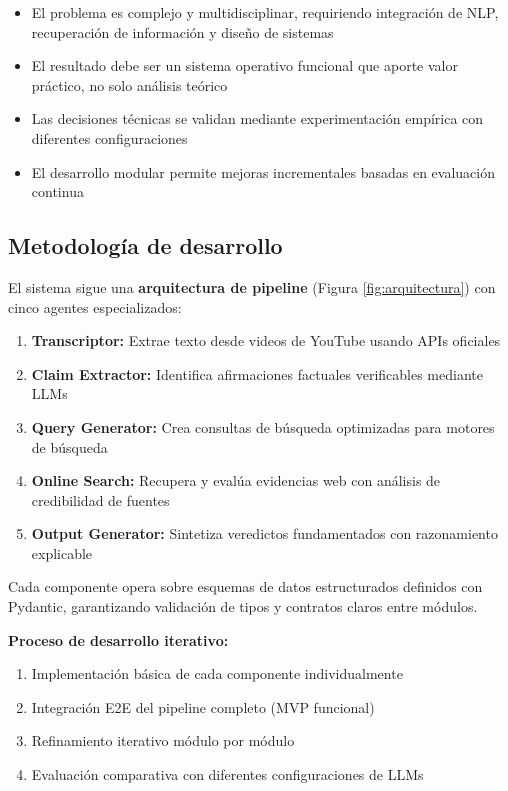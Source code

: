 \documentclass[12pt,a4paper]{article}
\begin{document}
\begin{itemize}
    \item El problema es complejo y multidisciplinar, requiriendo integración de NLP, recuperación de información y diseño de sistemas
    \item El resultado debe ser un sistema operativo funcional que aporte valor práctico, no solo análisis teórico
    \item Las decisiones técnicas se validan mediante experimentación empírica con diferentes configuraciones
    \item El desarrollo modular permite mejoras incrementales basadas en evaluación continua
\end{itemize}

\subsection{Metodología de desarrollo}

El sistema sigue una \textbf{arquitectura de pipeline} (Figura \ref{fig:arquitectura}) con cinco agentes especializados:

\begin{enumerate}
    \item \textbf{Transcriptor:} Extrae texto desde videos de YouTube usando APIs oficiales
    \item \textbf{Claim Extractor:} Identifica afirmaciones factuales verificables mediante LLMs
    \item \textbf{Query Generator:} Crea consultas de búsqueda optimizadas para motores de búsqueda
    \item \textbf{Online Search:} Recupera y evalúa evidencias web con análisis de credibilidad de fuentes
    \item \textbf{Output Generator:} Sintetiza veredictos fundamentados con razonamiento explicable
\end{enumerate}

Cada componente opera sobre esquemas de datos estructurados definidos con Pydantic, garantizando validación de tipos y contratos claros entre módulos.

\textbf{Proceso de desarrollo iterativo:}
\begin{enumerate}
    \item Implementación básica de cada componente individualmente
    \item Integración E2E del pipeline completo (MVP funcional)
    \item Refinamiento iterativo módulo por módulo
    \item Evaluación comparativa con diferentes configuraciones de LLMs
\end{enumerate}
\end{document}
